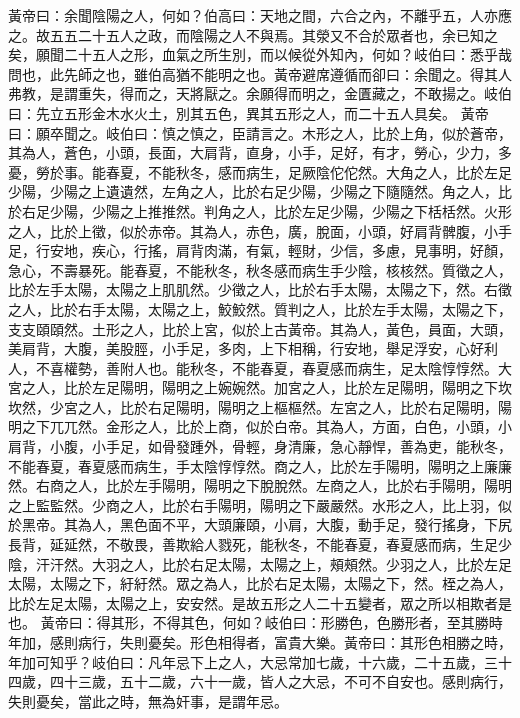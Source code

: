 黃帝曰：余聞陰陽之人，何如？伯高曰：天地之間，六合之內，不離乎五，人亦應之。故五五二十五人之政，而陰陽之人不與焉。其滎又不合於眾者也，余已知之矣，願聞二十五人之形，血氣之所生別，而以候從外知內，何如？岐伯曰：悉乎哉問也，此先師之也，雖伯高猶不能明之也。黃帝避席遵循而卻曰：余聞之。得其人弗教，是謂重失，得而之，天將厭之。余願得而明之，金匱藏之，不敢揚之。岐伯曰：先立五形金木水火土，別其五色，異其五形之人，而二十五人具矣。
黃帝曰：願卒聞之。岐伯曰：慎之慎之，臣請言之。木形之人，比於上角，似於蒼帝，其為人，蒼色，小頭，長面，大肩背，直身，小手，足好，有才，勞心，少力，多憂，勞於事。能春夏，不能秋冬，感而病生，足厥陰佗佗然。大角之人，比於左足少陽，少陽之上遺遺然，左角之人，比於右足少陽，少陽之下隨隨然。角之人，比於右足少陽，少陽之上推推然。判角之人，比於左足少陽，少陽之下栝栝然。火形之人，比於上徵，似於赤帝。其為人，赤色，廣，脫面，小頭，好肩背髀腹，小手足，行安地，疾心，行搖，肩背肉滿，有氣，輕財，少信，多慮，見事明，好顏，急心，不壽暴死。能春夏，不能秋冬，秋冬感而病生手少陰，核核然。質徵之人，比於左手太陽，太陽之上肌肌然。少徵之人，比於右手太陽，太陽之下，然。右徵之人，比於右手太陽，太陽之上，鮫鮫然。質判之人，比於左手太陽，太陽之下，支支頤頤然。土形之人，比於上宮，似於上古黃帝。其為人，黃色，員面，大頭，美肩背，大腹，美股脛，小手足，多肉，上下相稱，行安地，舉足浮安，心好利人，不喜權勢，善附人也。能秋冬，不能春夏，春夏感而病生，足太陰惇惇然。大宮之人，比於左足陽明，陽明之上婉婉然。加宮之人，比於左足陽明，陽明之下坎坎然，少宮之人，比於右足陽明，陽明之上樞樞然。左宮之人，比於右足陽明，陽明之下兀兀然。金形之人，比於上商，似於白帝。其為人，方面，白色，小頭，小肩背，小腹，小手足，如骨發踵外，骨輕，身清廉，急心靜悍，善為吏，能秋冬，不能春夏，春夏感而病生，手太陰惇惇然。商之人，比於左手陽明，陽明之上廉廉然。右商之人，比於左手陽明，陽明之下脫脫然。左商之人，比於右手陽明，陽明之上監監然。少商之人，比於右手陽明，陽明之下嚴嚴然。水形之人，比上羽，似於黑帝。其為人，黑色面不平，大頭廉頤，小肩，大腹，動手足，發行搖身，下尻長背，延延然，不敬畏，善欺給人戮死，能秋冬，不能春夏，春夏感而病，生足少陰，汗汗然。大羽之人，比於右足太陽，太陽之上，頰頰然。少羽之人，比於左足太陽，太陽之下，紆紆然。眾之為人，比於右足太陽，太陽之下，然。桎之為人，比於左足太陽，太陽之上，安安然。是故五形之人二十五變者，眾之所以相欺者是也。
黃帝曰：得其形，不得其色，何如？岐伯曰：形勝色，色勝形者，至其勝時年加，感則病行，失則憂矣。形色相得者，富貴大樂。黃帝曰：其形色相勝之時，年加可知乎？岐伯曰：凡年忌下上之人，大忌常加七歲，十六歲，二十五歲，三十四歲，四十三歲，五十二歲，六十一歲，皆人之大忌，不可不自安也。感則病行，失則憂矣，當此之時，無為奸事，是謂年忌。

